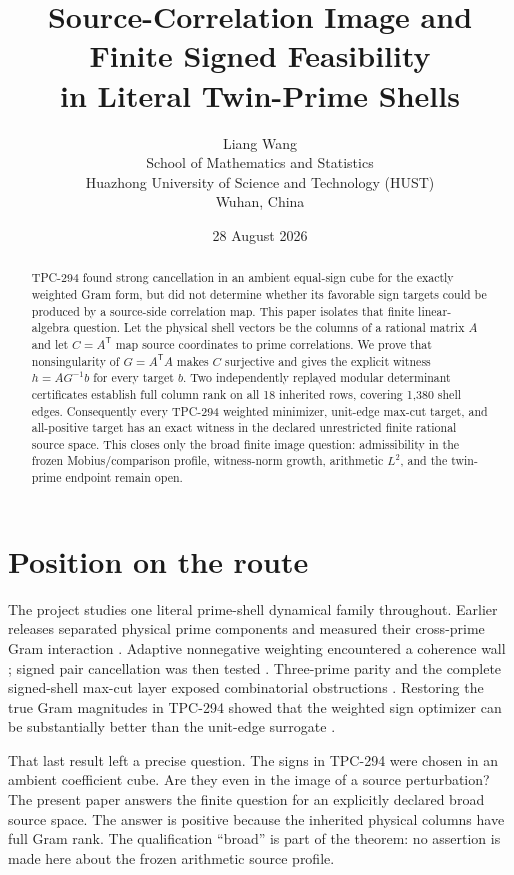 \documentclass[10pt]{article}
\title{Source-Correlation Image and Finite Signed Feasibility\\
in Literal Twin-Prime Shells}
\author{Liang Wang\\
School of Mathematics and Statistics\\
Huazhong University of Science and Technology (HUST)\\
Wuhan, China}
\date{28 August 2026}
\begin{document}
\maketitle

\begin{abstract}
TPC-294 found strong cancellation in an ambient equal-sign cube for the
exactly weighted Gram form, but did not determine whether its favorable sign
targets could be produced by a source-side correlation map.  This paper
isolates that finite linear-algebra question.  Let the physical shell
vectors be the columns of a rational matrix $A$ and let
$C=A^{\mathsf T}$ map source coordinates to prime correlations.  We prove
that nonsingularity of $G=A^{\mathsf T}A$ makes $C$ surjective and gives the
explicit witness $h=AG^{-1}b$ for every target $b$.  Two independently
replayed modular determinant certificates establish full column rank on all
18 inherited rows, covering 1,380 shell edges.  Consequently every
TPC-294 weighted minimizer, unit-edge max-cut target, and all-positive target
has an exact witness in the declared unrestricted finite rational source
space.  This closes only the broad finite image question: admissibility in
the frozen Mobius/comparison profile, witness-norm growth, arithmetic
$L^2$, and the twin-prime endpoint remain open.
\end{abstract}

\section{Position on the route}

The project studies one literal prime-shell dynamical family throughout.
Earlier releases separated physical prime components and measured their
cross-prime Gram interaction \cite{tpc287,tpc288,tpc289}.  Adaptive
nonnegative weighting encountered a coherence wall \cite{tpc290}; signed
pair cancellation was then tested \cite{tpc291}.  Three-prime parity and
the complete signed-shell max-cut layer exposed combinatorial obstructions
\cite{tpc292,tpc293}.  Restoring the true Gram magnitudes in TPC-294 showed
that the weighted sign optimizer can be substantially better than the
unit-edge surrogate \cite{tpc294}.

That last result left a precise question.  The signs in TPC-294 were chosen
in an ambient coefficient cube.  Are they even in the image of a source
perturbation?  The present paper answers the finite question for an
explicitly declared broad source space.  The answer is positive because
the inherited physical columns have full Gram rank.  The qualification
``broad'' is part of the theorem: no assertion is made here about the
frozen arithmetic source profile.
\end{document}
